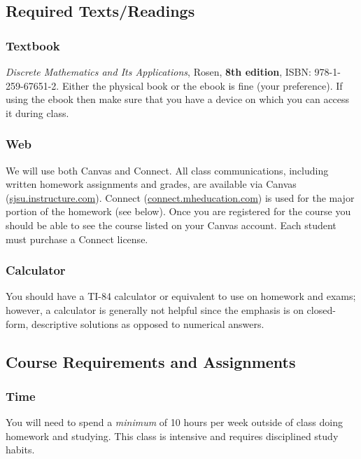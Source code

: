 \documentclass[letterpaper,12pt,fleqn]{article}
\begin{document}
\subsection*{Required Texts/Readings}

\subsubsection*{Textbook}

\emph{Discrete Mathematics and Its Applications}, Rosen, \textbf{8th edition}, ISBN: 978-1-259-67651-2.  Either the
physical book or the ebook is fine (your preference).  If using the ebook then make sure that you have a device on
which you can access it during class.

\subsubsection*{Web}

We will use both Canvas and Connect. All class communications, including written homework assignments and grades,
are available via Canvas (\url{sjsu.instructure.com}).  Connect (\url{connect.mheducation.com}) is used for the
major portion of the homework (see below).  Once you are registered for the course you should be able to see the
course listed on your Canvas account.  Each student must purchase a Connect license.

\subsubsection*{Calculator}

You should have a TI-84 calculator or equivalent to use on homework and exams; however, a calculator is generally
not helpful since the emphasis is on closed-form, descriptive solutions as opposed to numerical answers.

\subsection*{Course Requirements and Assignments}

\subsubsection*{Time}

You will need to spend a \emph{minimum} of 10 hours per week outside of class doing homework and studying. This
class is intensive and requires disciplined study habits.
\end{document}
